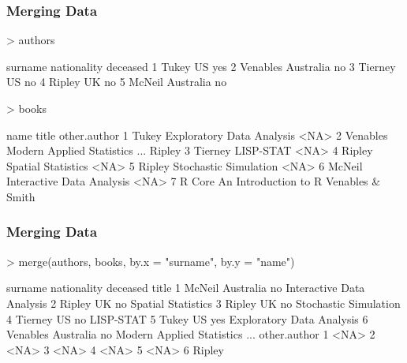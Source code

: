 \documentclass[10pt,slidestop,mathserif,c]{beamer}
\begin{document}
\begin{frame}
	\frametitle{Merging Data}

\begin{Schunk}
\begin{Sinput}
> authors
\end{Sinput}
\begin{Soutput}
   surname nationality deceased
1    Tukey          US      yes
2 Venables   Australia       no
3  Tierney          US       no
4   Ripley          UK       no
5   McNeil   Australia       no
\end{Soutput}
\begin{Sinput}
> books
\end{Sinput}
\begin{Soutput}
      name                         title     other.author
1    Tukey     Exploratory Data Analysis             <NA>
2 Venables Modern Applied Statistics ...           Ripley
3  Tierney                     LISP-STAT             <NA>
4   Ripley            Spatial Statistics             <NA>
5   Ripley         Stochastic Simulation             <NA>
6   McNeil     Interactive Data Analysis             <NA>
7   R Core          An Introduction to R Venables & Smith
\end{Soutput}
\end{Schunk}
\end{frame}

\begin{frame}
	\frametitle{Merging Data}

\begin{Schunk}
\begin{Sinput}
> merge(authors, books, by.x = "surname", by.y = "name")
\end{Sinput}
\begin{Soutput}
   surname nationality deceased                         title
1   McNeil   Australia       no     Interactive Data Analysis
2   Ripley          UK       no            Spatial Statistics
3   Ripley          UK       no         Stochastic Simulation
4  Tierney          US       no                     LISP-STAT
5    Tukey          US      yes     Exploratory Data Analysis
6 Venables   Australia       no Modern Applied Statistics ...
  other.author
1         <NA>
2         <NA>
3         <NA>
4         <NA>
5         <NA>
6       Ripley
\end{Soutput}
\end{Schunk}
\end{frame}
\end{document}
